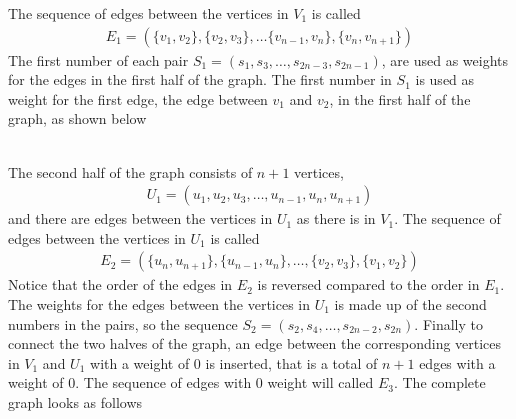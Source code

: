 The sequence of edges between the vertices in $V_1$ is called 
\begin{align*}
    E_1 = (\{v_1, v_2\}, \{v_2,v_3\},\ldots \{v_{n-1},v_n\}, \{v_n,v_{n+1}\})   
\end{align*}
The first number of each pair $S_1 = (s_1,s_3,\ldots,s_{2n-3},s_{2n-1})$, are used as weights for the edges in the first half of the graph. The first number in $S_1$ is used as weight for the first edge, the edge between $v_1$ and $v_2$, in the first half of the graph, as shown below

\noindent\begin{minipage}{\textwidth}
	\centering
\end{minipage}
\\

The second half of the graph consists of $n+1$ vertices,
\begin{align*}
    U_1 = (u_1,u_2,u_3,\ldots,u_{n-1},u_n,u_{n+1})
\end{align*}
and there are edges between the vertices in $U_1$ as there is in $V_1$. The sequence of edges between the vertices in $U_1$ is called
\begin{align*}
    E_2 = (\{u_n,u_{n+1}\}, \{u_{n-1},u_n\}, \ldots, \{v_2,v_3\}, \{v_1, v_2\})
\end{align*}
Notice that the order of the edges in $E_2$ is reversed compared to the order in $E_1$. The weights for the edges between the vertices in $U_1$ is made up of the second numbers in the pairs, so the sequence $S_2 = (s_2,s_4,\ldots,s_{2n-2},s_{2n})$. Finally to connect the two halves of the graph, an edge between the corresponding vertices in $V_1$ and $U_1$ with a weight of 0 is inserted, that is a total of $n+1$ edges with a weight of 0. The sequence of edges with 0 weight will called $E_3$. The complete graph looks as follows

